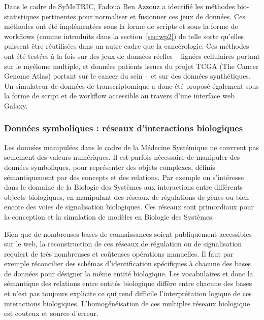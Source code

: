 \documentclass[a4paper,10pt]{article}
\theoremstyle{definition}
\begin{document}
Dans le cadre de SyMeTRIC, Fadoua Ben Azzouz a identifié les méthodes bio-statistiques pertinentes pour normaliser et fusionner ces jeux de données. Ces méthodes ont été implémentées sous la forme de scripts et sous la forme de workflows (comme introduits dans la section~\ref{sec:wp2}) de telle sorte qu'elles puissent être réutilisées dans un autre cadre que la cancérologie. Ces méthodes ont été testées à la fois sur des jeux de données réelles -- lignées cellulaires portant sur le myélome multiple, et données patients issues du projet TCGA (The Cancer Genome Atlas) portant sur le cancer du sein -- et sur des données synthétiques. Un simulateur de données de transcriptomique a donc été proposé également sous la forme de script et de workflow accessible au travers d'une interface web Galaxy. 
 
\subsubsection{Données symboliques : réseaux d'interactions biologiques} 
Les données manipulées dans le cadre de la Médecine Systémique ne couvrent pas seulement des valeurs numériques. Il est parfois nécessaire de manipuler des données symboliques, pour représenter des objets complexes, définis sémantiquement par des concepts et des relations. Par exemple on s'intéresse dans le domaine de la Biologie des Systèmes aux interactions entre différents objects biologiques, en manipulant des réseaux de régulations de gènes ou bien encore des voies de signalisation biologiques. Ces réseaux sont primordiaux pour la conception et la simulation de modèles en Biologie des Systèmes. 

Bien que de nombreuses bases de connaissances soient publiquement accessibles sur le web, la reconstruction de ces réseaux de régulation ou de signalisation requiert de très nombreuses et coûteuses opérations manuelles. Il faut par exemple réconcilier des schémas d'identification spécifiques à chacune des bases de données pour désigner la même entité biologique. Les vocabulaires et donc la sémantique des relations entre entités biologique diffère entre chacune des bases et n'est pas toujours explicite ce qui rend difficile l'interprétation logique de ces interactions biologiques. L'homogénéisation de ces multiples réseaux biologique est couteux et source d'erreur. 
\end{document}
